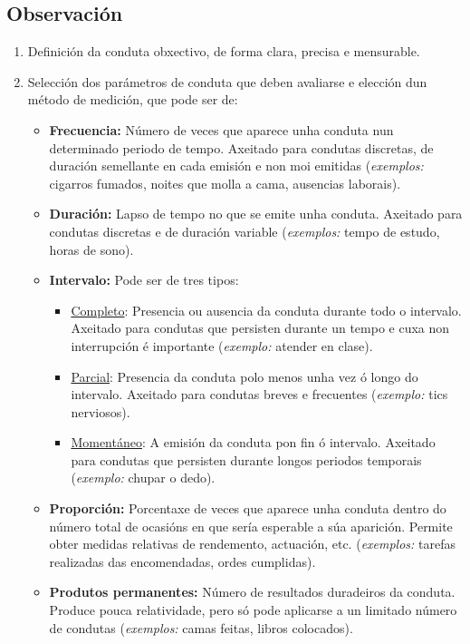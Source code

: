\documentclass[a4paper,11pt]{article}
\begin{document}
\subsection{Observación}
\begin{enumerate}
	\item Definición da conduta obxectivo, de forma clara, precisa e mensurable.
	\item Selección dos parámetros de conduta que deben avaliarse e elección dun método de medición, 
	que pode ser de:
	\begin{itemize}
		\item \textbf{Frecuencia:} Número de veces que aparece unha conduta nun determinado periodo 
		de tempo. Axeitado para condutas discretas, de duración semellante en cada emisión e non moi 
		emitidas (\textit{exemplos:} cigarros fumados, noites que molla a cama, ausencias laborais). 
		\item \textbf{Duración:} Lapso de tempo no que se emite unha conduta. Axeitado para condutas 
		discretas e de duración variable (\textit{exemplos:} tempo de estudo, horas de sono). 
		\item \textbf{Intervalo:} Pode ser de tres tipos:
		\begin{itemize}
			\item \underline{Completo}: Presencia ou ausencia da conduta durante todo o intervalo. 
			Axeitado para condutas que persisten durante un tempo e cuxa non interrupción é 
			importante (\textit{exemplo:} atender en clase).
			\item \underline{Parcial}: Presencia da conduta polo menos unha vez ó longo do intervalo. 
			Axeitado para condutas breves e frecuentes (\textit{exemplo:} tics nerviosos).
			\item \underline{Momentáneo}: A emisión da conduta pon fin ó intervalo. Axeitado para 
			condutas que persisten durante longos periodos temporais (\textit{exemplo:} chupar o 
			dedo). 
		\end{itemize}
		\item \textbf{Proporción:} Porcentaxe de veces que aparece unha conduta dentro do número 
		total de ocasións en que sería esperable a súa aparición. Permite obter medidas relativas de 
		rendemento, actuación, etc. (\textit{exemplos:} tarefas realizadas das encomendadas, ordes 
		cumplidas). 
		\item \textbf{Produtos permanentes:} Número de resultados duradeiros da conduta. Produce 
		pouca relatividade, pero só pode aplicarse a un limitado número de condutas 
		(\textit{exemplos:} camas feitas, libros colocados). 

\end{itemize}
\end{enumerate}
\end{document}
